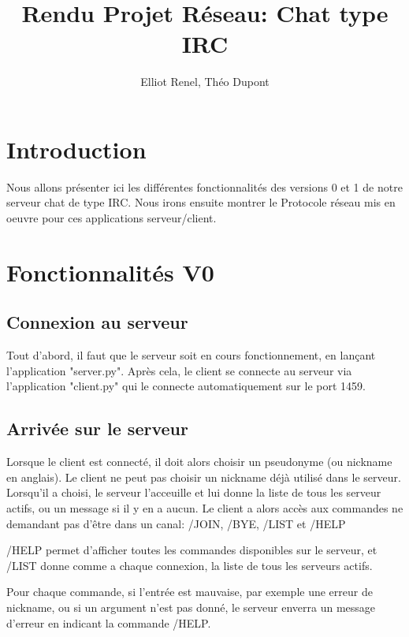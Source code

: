 \documentclass[10pt]{article}
\title{Rendu Projet Réseau: Chat type IRC}
\author{Elliot Renel, Théo Dupont}
\begin{document}
\maketitle

\tableofcontents

\newpage

\section{Introduction}

Nous allons présenter ici les différentes fonctionnalités des versions 0 et 1 de notre serveur chat de type IRC.
Nous irons ensuite montrer le Protocole réseau mis en oeuvre pour ces applications serveur/client.

\section{Fonctionnalités V0}


\subsection{Connexion au serveur}

Tout d'abord, il faut que le serveur soit en cours fonctionnement, en lançant l'application "server.py".
Après cela, le client se connecte au serveur via l'application "client.py" qui le connecte automatiquement sur le port 1459.

\subsection{Arrivée sur le serveur}

Lorsque le client est connecté, il doit alors choisir un pseudonyme (ou nickname en anglais). 
Le client ne peut pas choisir un nickname déjà utilisé dans le serveur.
Lorsqu'il a choisi, le serveur l'acceuille et lui donne la liste de tous les serveur actifs, ou un message si il y en a aucun.
Le client a alors accès aux commandes ne demandant pas d'être dans un canal: /JOIN, /BYE, /LIST et /HELP

/HELP permet d'afficher toutes les commandes disponibles sur le serveur, et /LIST donne comme a chaque connexion, la liste de tous les serveurs actifs.

Pour chaque commande, si l'entrée est mauvaise, par exemple une erreur de nickname, ou si un argument n'est pas donné, le serveur enverra un message d'erreur en indicant la commande /HELP.
\end{document}
